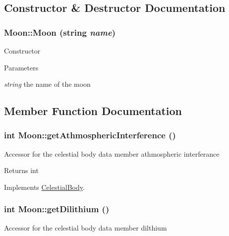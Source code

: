 \subsection{Constructor \& Destructor Documentation}
\hypertarget{classMoon_a5215a61100839fba014a10816182c601}{
\subsubsection[{Moon}]{\setlength{\rightskip}{0pt plus 5cm}Moon::Moon (string {\em name})}}
\label{d8/d6f/classMoon_a5215a61100839fba014a10816182c601}
Constructor


\begin{DoxyParams}{Parameters}
\item[{\em string}]the name of the moon \end{DoxyParams}


\subsection{Member Function Documentation}
\hypertarget{classMoon_af15b50721bac099545c7a0be97d04483}{
\subsubsection[{getAthmosphericInterference}]{\setlength{\rightskip}{0pt plus 5cm}int Moon::getAthmosphericInterference ()}}
\label{d8/d6f/classMoon_af15b50721bac099545c7a0be97d04483}
Accessor for the celestial body data member athmospheric interferance

\begin{DoxyReturn}{Returns}
int 
\end{DoxyReturn}


Implements \hyperlink{classCelestialBody}{CelestialBody}.

\hypertarget{classMoon_ac79186e5684da6bebfd9821ff655bc71}{
\subsubsection[{getDilithium}]{\setlength{\rightskip}{0pt plus 5cm}int Moon::getDilithium ()}}
\label{d8/d6f/classMoon_ac79186e5684da6bebfd9821ff655bc71}
Accessor for the celestial body data member dilthium

